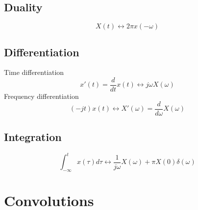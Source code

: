 \documentclass[]{article}
\begin{document}
\begin{multicols}{2}
\subsection{Duality}
\[ X(t) \longleftrightarrow 2\pi x(-\omega) \]
\subsection{Differentiation}
Time differentiation
\[ x'(t) = \frac{d}{dt}x(t) \longleftrightarrow j\omega X(\omega) \]
Frequency differentiation
\[ (-jt)x(t) \longleftrightarrow X'(\omega) = \frac{d}{d\omega}X(\omega) \]
\subsection{Integration}
\[ \int_{-\infty}^{t} x(\tau)d\tau \longleftrightarrow \frac{1}{j\omega}X(\omega) + \pi X(0)\delta(\omega) \]

\section{Convolutions}


\end{multicols}
\end{document}
